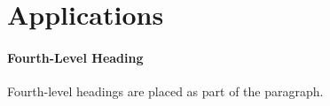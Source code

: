 \section{Applications}

\paragraph{Fourth-Level Heading} Fourth-level headings are placed as part of the paragraph.

